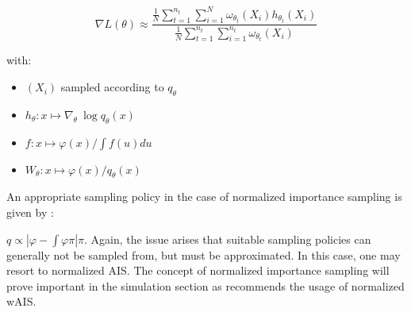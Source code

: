 $$\nabla L(\theta) \approx \frac{ \frac 1 N \displaystyle\sum\limits_{t=1}^{n_t}\sum_{i=1}^N \omega_{\theta_t}(X_i) h_{\theta_t}(X_i)}
{\frac 1 N \displaystyle\sum\limits_{t=1}^{n_t}\sum_{i=1}^{n_t} \omega_{\theta_t}(X_i)}$$


with:
\begin{itemize}
\item $(X_i)$  sampled according to $q_\theta$
\item $h_\theta : x \mapsto \nabla_\theta \ \log q_\theta(x)$ 
\item $f : x \mapsto \varphi(x) / \int f(u)du$
\item $W_\theta : x \mapsto \varphi(x) / q_\theta(x)$
\end{itemize}

An appropriate sampling policy in the case of normalized importance sampling is given by :

$q \propto |\varphi - \displaystyle \int \varphi \pi|\pi$. Again, the issue arises that suitable sampling policies can generally not be sampled from, but must be approximated. In this case, one may resort to normalized AIS. \cite{douc2007minimum} The concept of normalized importance sampling will prove important in the simulation section as \cite{portierdelyonWAIS} recommends the usage of normalized wAIS.
